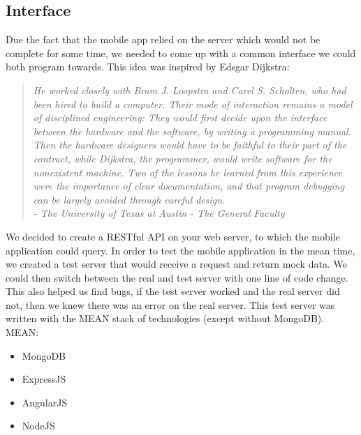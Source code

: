 \subsection{Interface}
Due the fact that the mobile app relied on the server which would not be complete for some time, we needed to come up with a common interface we could both program towards.
This idea was inspired by Edsgar Dijkstra:
\begin{quote}
	\itshape He worked closely with Bram J. Loopstra and Carel S. Scholten, who had been hired to build a computer. Their mode of interaction remains a model of disciplined engineering: They would first decide upon the interface between the hardware and the software, by writing a programming manual. Then the hardware designers would have to be faithful to their part of the contract, while Dijkstra, the programmer, would write software for the nonexistent machine. Two of the lessons he learned from this experience were the importance of clear documentation, and that program debugging can be largely avoided through careful design.
	\hfill 
	\\
	- The University of Texas at Austin - The General Faculty \cite{dijkstra_interface}
\end{quote}

We decided to create a RESTful API on your web server, to which the mobile application could query.
In order to test the mobile application in the mean time, we created a test server that would receive a request and return mock data.
We could then switch between the real and test server with one line of code change.
This also helped us find bugs, if the test server worked and the real server did not, then we knew there was an error on the real server.
This test server was written with the MEAN stack of technologies (except without MongoDB).
\\

MEAN:
\begin{itemize}
\item MongoDB
\item ExpressJS
\item AngularJS
\item NodeJS
\end{itemize}

